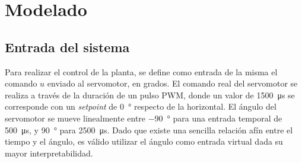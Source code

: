\section{Modelado}

\subsection{Entrada del sistema}


Para realizar el control de la planta, se define como entrada de la misma el comando $u$ enviado al servomotor, en grados. El comando real del servomotor se realiza a través de la duración de un pulso PWM, donde un valor de \qty{1500}{\us} se corresponde con un \emph{setpoint} de \qty{0}{\degree} respecto de la horizontal. El ángulo del servomotor se mueve linealmente entre \qty{-90}{\degree} para una entrada temporal de \qty{500}{\us}, y \qty{90}{\degree} para \qty{2500}{\us}. Dado que existe una sencilla relación afín entre el tiempo y el ángulo, es válido utilizar el ángulo como entrada virtual dada su mayor interpretabilidad.

